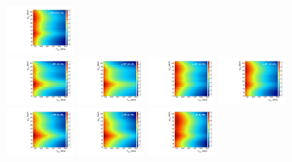 \begin{figure}[htbp]
  \includegraphics[width=0.2\textwidth]{fig/analysisAppendix/template_res_e_LP_nobb_LDy.pdf}\\
  \includegraphics[width=0.2\textwidth]{fig/analysisAppendix/template_res_mu_HP_vbf_LDy.pdf}
  \includegraphics[width=0.2\textwidth]{fig/analysisAppendix/template_res_e_HP_vbf_LDy.pdf}
  \includegraphics[width=0.2\textwidth]{fig/analysisAppendix/template_res_mu_LP_vbf_LDy.pdf}
  \includegraphics[width=0.2\textwidth]{fig/analysisAppendix/template_res_e_LP_vbf_LDy.pdf}\\
  \includegraphics[width=0.2\textwidth]{fig/analysisAppendix/template_res_mu_HP_bb_HDy.pdf}
  \includegraphics[width=0.2\textwidth]{fig/analysisAppendix/template_res_e_HP_bb_HDy.pdf}
  \includegraphics[width=0.2\textwidth]{fig/analysisAppendix/template_res_mu_LP_bb_HDy.pdf}

\end{figure}
